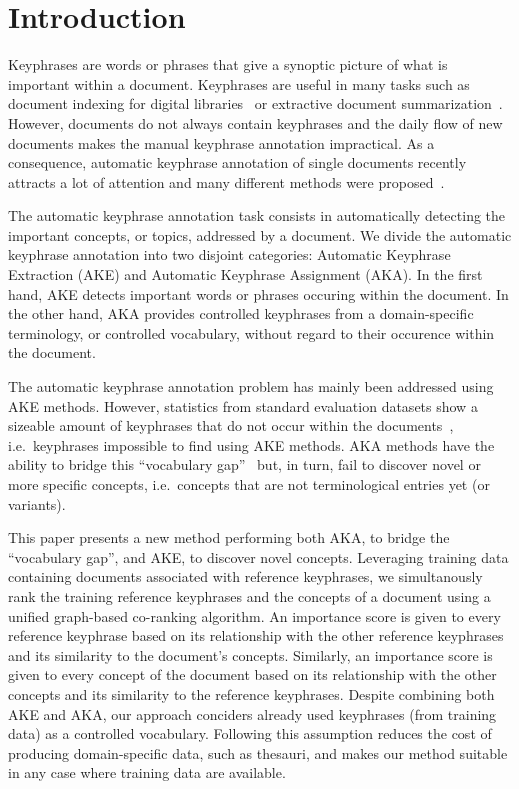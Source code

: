 \section{Introduction}
\label{sec: introduction}
  Keyphrases are words or phrases that give a synoptic picture of what is
  important within a document. Keyphrases are useful in many tasks such as
  document indexing for digital
  libraries~\cite{gutwin1999keyphrasesfordigitallibraries} or extractive
  document summarization~\cite{litvak2008graphbased}. However, documents do not
  always contain keyphrases and the daily flow of new documents makes the manual
  keyphrase annotation impractical. As a consequence, automatic keyphrase
  annotation of single documents recently attracts a lot of attention and many
  different methods were proposed~\cite{hasan2014state_of_the_art}.

  The automatic keyphrase annotation task consists in automatically detecting
  the important concepts, or topics, addressed by a document. We divide the
  automatic keyphrase annotation into two disjoint categories: Automatic
  Keyphrase Extraction (AKE) and Automatic Keyphrase Assignment (AKA). In the
  first hand, AKE detects important words or phrases occuring within the
  document. In the other hand, AKA provides controlled keyphrases from a
  domain-specific terminology, or controlled vocabulary, without regard to their
  occurence within the document.

  The automatic keyphrase annotation problem has mainly been addressed using AKE
  methods. However, statistics from standard evaluation datasets show a sizeable
  amount of keyphrases that do not occur within the
  documents~\cite{bougouin2013topicrank}, i.e.~keyphrases impossible to find
  using AKE methods. AKA methods have the ability to bridge this ``vocabulary
  gap''~\cite{liu2011vocabularygap} but, in turn, fail to discover novel or more
  specific concepts, i.e.~concepts that are not terminological entries yet (or
  variants).

  This paper presents a new method performing both AKA, to bridge the
  ``vocabulary gap'', and AKE, to discover novel concepts. Leveraging training
  data containing documents associated with reference keyphrases, we
  simultanously rank the training reference keyphrases and the concepts of a
  document using a unified graph-based co-ranking algorithm. An importance score
  is given to every reference keyphrase based on its relationship with the other
  reference keyphrases and its similarity to the document's concepts. Similarly,
  an importance score is given to every concept of the document based on its
  relationship with the other concepts and its similarity to the reference
  keyphrases. Despite combining both AKE and AKA, our approach conciders already
  used keyphrases (from training data) as a controlled vocabulary. Following
  this assumption reduces the cost of producing domain-specific data, such as
  thesauri, and makes our method suitable in any case where training data are
  available.

